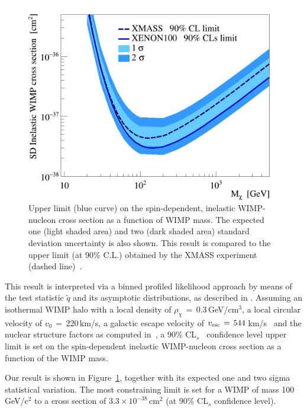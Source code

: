 \begin{figure}[t]
  \includegraphics[width=\linewidth]{images/limit_reb.png}
  \caption{Upper limit (blue curve) on the spin-dependent, inelastic WIMP-nucleon cross section as a function of WIMP mass.  
	  The expected one (light shaded area) and two (dark shaded area) standard deviation uncertainty is also shown. 
	  This result is compared to the upper limit (at 90\% C.L.) obtained by the XMASS experiment (dashed line)~\cite{Uchida:2014cnn}.}
  \label{fig:limits}
\end{figure}

This result is interpreted via a binned profiled likelihood approach by means of the test statistic $\tilde{q}$
and its asymptotic distributions, as  described in \cite{asympt}. 
Assuming  an isothermal WIMP halo with a local density of $\rho_{\chi} \, = \, 0.3$\,GeV/cm$^3$, a local circular velocity of $v_0 \,= \, 220$\,km/s, 
a galactic escape velocity of $v_{\rm{esc}} \, = \, 544$\,km/s~\cite{Smith:2006ym}  
and the nuclear structure factors as computed in~\cite{Baudis:2013bba}, 
a 90\% CL$_s$~\cite{cls} confidence level upper limit is set on the spin-dependent inelastic WIMP-nucleon cross section as a function of the WIMP mass. 



Our result is shown in Figure~\ref{fig:limits}, together with its expected one and two sigma statistical variation.
The most constraining limit is  set for a WIMP of mass 100\,GeV/c$^2$ to a cross section of $3.3 \times 10^{-38}$\,cm$^{2}$ (at 90\% CL$_s$ confidence level). 

